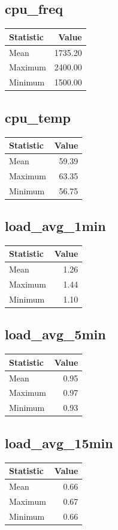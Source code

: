 \documentclass[11pt]{article}
\begin{document}
\subsection{cpu_freq}
\begin{tabular}{lr}
\toprule
Statistic & Value \\
\midrule
Mean & 1735.20 \\
Maximum & 2400.00 \\
Minimum & 1500.00 \\
\bottomrule
\end{tabular}


\subsection{cpu_temp}
\begin{tabular}{lr}
\toprule
Statistic & Value \\
\midrule
Mean & 59.39 \\
Maximum & 63.35 \\
Minimum & 56.75 \\
\bottomrule
\end{tabular}


\subsection{load_avg_1min}
\begin{tabular}{lr}
\toprule
Statistic & Value \\
\midrule
Mean & 1.26 \\
Maximum & 1.44 \\
Minimum & 1.10 \\
\bottomrule
\end{tabular}


\subsection{load_avg_5min}
\begin{tabular}{lr}
\toprule
Statistic & Value \\
\midrule
Mean & 0.95 \\
Maximum & 0.97 \\
Minimum & 0.93 \\
\bottomrule
\end{tabular}


\subsection{load_avg_15min}
\begin{tabular}{lr}
\toprule
Statistic & Value \\
\midrule
Mean & 0.66 \\
Maximum & 0.67 \\
Minimum & 0.66 \\
\bottomrule
\end{tabular}
\end{document}
